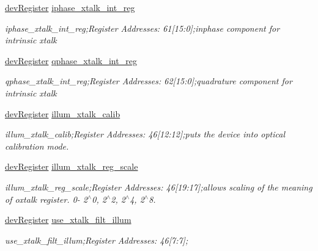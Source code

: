 \begin{DoxyCompactItemize}
\mbox{\hyperlink{classdev_register}{dev\+Register}} \mbox{\hyperlink{class_o_p_t3101_registers_ab58fcca1b375342bd44b6b1088e3238d}{iphase\+\_\+xtalk\+\_\+int\+\_\+reg}}
\begin{DoxyCompactList}\small\item\em iphase\+\_\+xtalk\+\_\+int\+\_\+reg;Register Addresses\+: 61\mbox{[}15\+:0\mbox{]};inphase component for intrinsic xtalk \end{DoxyCompactList}\item 
\mbox{\hyperlink{classdev_register}{dev\+Register}} \mbox{\hyperlink{class_o_p_t3101_registers_a066f2b307e53308779b547c3b4ee1ce8}{qphase\+\_\+xtalk\+\_\+int\+\_\+reg}}
\begin{DoxyCompactList}\small\item\em qphase\+\_\+xtalk\+\_\+int\+\_\+reg;Register Addresses\+: 62\mbox{[}15\+:0\mbox{]};quadrature component for intrinsic xtalk \end{DoxyCompactList}\item 
\mbox{\hyperlink{classdev_register}{dev\+Register}} \mbox{\hyperlink{class_o_p_t3101_registers_a40bd471704dd07e491df7aa972e53484}{illum\+\_\+xtalk\+\_\+calib}}
\begin{DoxyCompactList}\small\item\em illum\+\_\+xtalk\+\_\+calib;Register Addresses\+: 46\mbox{[}12\+:12\mbox{]};puts the device into optical calibration mode. \end{DoxyCompactList}\item 
\mbox{\hyperlink{classdev_register}{dev\+Register}} \mbox{\hyperlink{class_o_p_t3101_registers_af8b0b2d6abbb466f43e09e44351f7992}{illum\+\_\+xtalk\+\_\+reg\+\_\+scale}}
\begin{DoxyCompactList}\small\item\em illum\+\_\+xtalk\+\_\+reg\+\_\+scale;Register Addresses\+: 46\mbox{[}19\+:17\mbox{]};allows scaling of the meaning of oxtalk register. 0-\/ 2$^\wedge$0, 2$^\wedge$2, 2$^\wedge$4, 2$^\wedge$8. \end{DoxyCompactList}\item 
\mbox{\hyperlink{classdev_register}{dev\+Register}} \mbox{\hyperlink{class_o_p_t3101_registers_ab7e048b48ce2dbfcc65b22d20d3cb561}{use\+\_\+xtalk\+\_\+filt\+\_\+illum}}
\begin{DoxyCompactList}\small\item\em use\+\_\+xtalk\+\_\+filt\+\_\+illum;Register Addresses\+: 46\mbox{[}7\+:7\mbox{]}; \end{DoxyCompactList}\item 

\end{DoxyCompactItemize}
